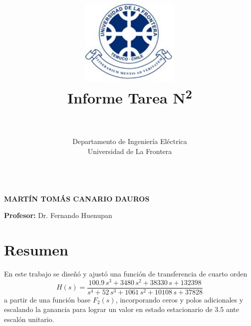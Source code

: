 \documentclass[11pt,letterpaper]{article}
\renewcommand{\headrulewidth}{0pt}
\renewcommand{\footrulewidth}{0pt}
\renewcommand{\headrulewidth}{0pt}
\renewcommand{\footrulewidth}{0pt}
\begin{document}
\lstset{language=Python}

\chead[]{}
\renewcommand{\headrulewidth}{0.5pt}

\cfoot[]{}
\rfoot[]{\thepage}
\renewcommand{\footrulewidth}{0.5pt}

\title{\includegraphics[width=4.7cm]{./img/logo.png} \\
\textbf{Informe Tarea N\textsuperscript{2}}}

\author{
\rule{10cm}{0.1mm} \\
Departamento de Ingeniería Eléctrica \\
\small Universidad de La Frontera \\
\rule{10cm}{0.1mm} 
}

\maketitle
\abstract{}
\vfill
    \begin{flushright}
    \textbf{\uppercase\expandafter{Martín Tomás Canario Dauros}}\\
    \end{flushright}
\vskip 0.1in
    \begin{flushleft}
    \textbf{Profesor:} Dr. Fernando Huenupan\\
    \end{flushleft}
\lstset{language=C, breaklines=true, basicstyle=\scriptsize}
\newpage
\normalsize

\tableofcontents

\newpage
\section{Resumen}

En este trabajo se diseñó y ajustó una función de transferencia de cuarto orden
\[
H(s)=\frac{100.9\,s^3+3480\,s^2+38330\,s+132398}{s^4+52\,s^3+1061\,s^2+10108\,s+37828}
\]
a partir de una función base \(F_2(s)\), incorporando ceros y polos adicionales y escalando la ganancia para lograr un valor en estado estacionario de 3.5 ante escalón unitario.
\end{document}
